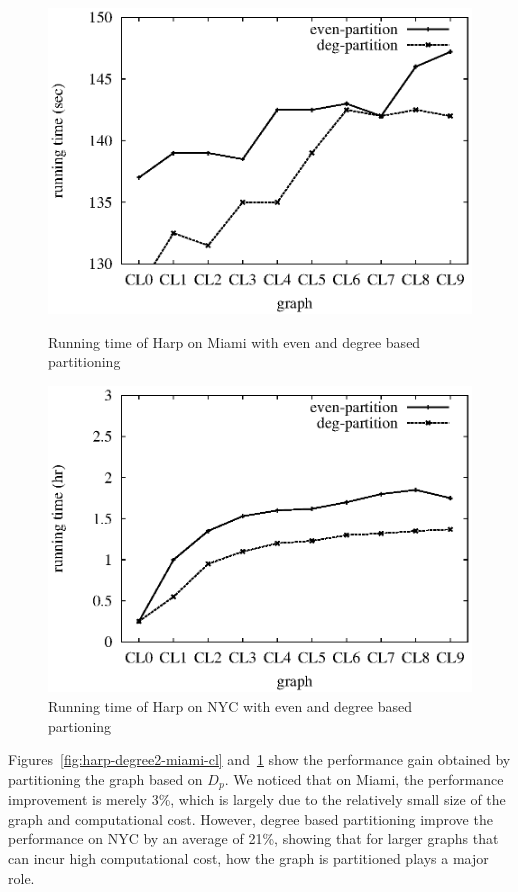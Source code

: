 \begin{figure}[htbp]
\hfill
\begin{minipage}[t]{0.45\linewidth}
\begin{center}
\centerline{\includegraphics[scale=0.35]{plots/harp-degree2-miami-cl.eps}}
\caption{Running time of Harp on Miami with even and degree based partitioning}
\label{fig:harp-degree2-miami-cl}
\end{center}
\end{minipage}
\hfill
\begin{minipage}[t]{0.45\linewidth}
\begin{center}
\centerline{\includegraphics[scale=0.35]{plots/harp-degree2-nyc-cl.eps}}
\caption{Running time of Harp on NYC with even and degree based partioning}
\label{fig:harp-degree2-nyc-cl}
\end{center}
\end{minipage}
\hfill
\end{figure}

Figures~\ref{fig:harp-degree2-miami-cl} and~\ref{fig:harp-degree2-nyc-cl} show
the performance gain obtained by partitioning the graph based on $D_p$. We
noticed that on Miami, the performance improvement is merely 3\%, which is
largely due to the relatively small size of the graph and computational cost.
However, degree based partitioning improve the performance on NYC by an average
of 21\%, showing that for larger graphs that can incur high computational cost,
how the graph is partitioned plays a major role.

